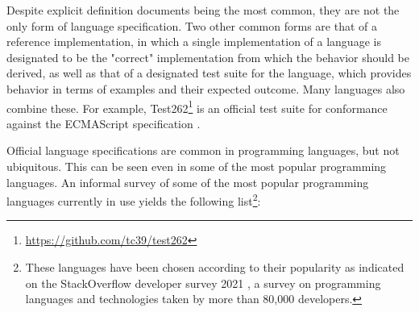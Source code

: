 Despite explicit definition documents being the most common, they are not the only form of language specification. Two other common forms are that of a reference implementation, in which a single implementation of a language is designated to be the "correct" implementation from which the behavior should be derived, as well as that of a designated test suite for the language, which provides behavior in terms of examples and their expected outcome. Many languages also combine these. For example, Test262\footnote{\url{https://github.com/tc39/test262}} is an official test suite for conformance against the ECMAScript specification \cite{ecma1999262}.\\


Official language specifications are common in programming languages, but not ubiquitous. This can be seen even in some of the most popular programming languages. An informal survey of some of the most popular programming languages currently in use yields the following list\footnote{These languages have been chosen according to their popularity as indicated on the StackOverflow developer survey 2021 \cite{stack_overflow_survey_2021}, a survey on programming languages and technologies taken by more than 80,000 developers.}:

